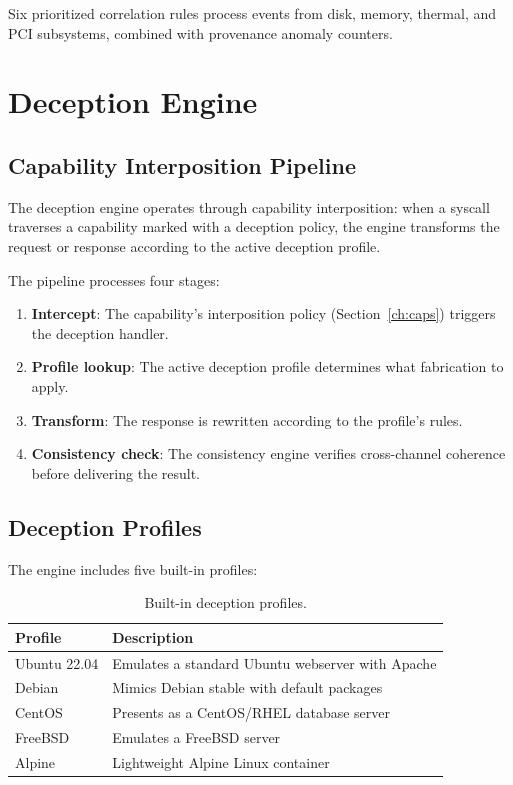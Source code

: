 \documentclass[11pt,a4paper,twoside]{report}
\theoremstyle{definition}
\begin{document}
Six prioritized correlation rules process events from disk, memory, thermal,
and PCI subsystems, combined with provenance anomaly counters.


\chapter{Deception Engine}
\label{ch:deception}

\section{Capability Interposition Pipeline}

The deception engine operates through capability interposition: when a
syscall traverses a capability marked with a deception policy, the engine
transforms the request or response according to the active deception
profile.

The pipeline processes four stages:
\begin{enumerate}[leftmargin=1.4em]
  \item \textbf{Intercept}: The capability's interposition policy
    (Section~\ref{ch:caps}) triggers the deception handler.
  \item \textbf{Profile lookup}: The active deception profile determines
    what fabrication to apply.
  \item \textbf{Transform}: The response is rewritten according to the
    profile's rules.
  \item \textbf{Consistency check}: The consistency engine verifies
    cross-channel coherence before delivering the result.
\end{enumerate}

\section{Deception Profiles}

The engine includes five built-in profiles:

\begin{table}[H]
\centering
\caption{Built-in deception profiles.}
\begin{tabularx}{\textwidth}{l X}
\toprule
\textbf{Profile} & \textbf{Description} \\
\midrule
Ubuntu 22.04  & Emulates a standard Ubuntu webserver with Apache \\
Debian        & Mimics Debian stable with default packages \\
CentOS        & Presents as a CentOS/RHEL database server \\
FreeBSD       & Emulates a FreeBSD server \\
Alpine        & Lightweight Alpine Linux container \\
\bottomrule
\end{tabularx}
\end{table}
\end{document}
